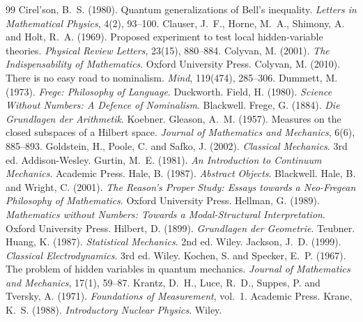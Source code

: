 \documentclass{situationist-preprint}
\begin{document}
\begin{thebibliography}{99}
 Cirel'son, B.~S. (1980). Quantum generalizations of Bell's inequality. \emph{Letters in Mathematical Physics}, 4(2), 93--100.
 Clauser, J.~F., Horne, M.~A., Shimony, A. and Holt, R.~A. (1969). Proposed experiment to test local hidden-variable theories. \emph{Physical Review Letters}, 23(15), 880--884.
 Colyvan, M. (2001). \emph{The Indispensability of Mathematics}. Oxford University Press.
 Colyvan, M. (2010). There is no easy road to nominalism. \emph{Mind}, 119(474), 285--306.
 Dummett, M. (1973). \emph{Frege: Philosophy of Language}. Duckworth.
 Field, H. (1980). \emph{Science Without Numbers: A Defence of Nominalism}. Blackwell.
 Frege, G. (1884). \emph{Die Grundlagen der Arithmetik}. Koebner.
 Gleason, A.~M. (1957). Measures on the closed subspaces of a Hilbert space. \emph{Journal of Mathematics and Mechanics}, 6(6), 885--893.
 Goldstein, H., Poole, C. and Safko, J. (2002). \emph{Classical Mechanics}. 3rd ed. Addison-Wesley.
 Gurtin, M.~E. (1981). \emph{An Introduction to Continuum Mechanics}. Academic Press.
 Hale, B. (1987). \emph{Abstract Objects}. Blackwell.
 Hale, B. and Wright, C. (2001). \emph{The Reason's Proper Study: Essays towards a Neo-Fregean Philosophy of Mathematics}. Oxford University Press.
 Hellman, G. (1989). \emph{Mathematics without Numbers: Towards a Modal-Structural Interpretation}. Oxford University Press.
 Hilbert, D. (1899). \emph{Grundlagen der Geometrie}. Teubner.
 Huang, K. (1987). \emph{Statistical Mechanics}. 2nd ed. Wiley.
 Jackson, J.~D. (1999). \emph{Classical Electrodynamics}. 3rd ed. Wiley.
 Kochen, S. and Specker, E.~P. (1967). The problem of hidden variables in quantum mechanics. \emph{Journal of Mathematics and Mechanics}, 17(1), 59--87.
 Krantz, D.~H., Luce, R.~D., Suppes, P. and Tversky, A. (1971). \emph{Foundations of Measurement}, vol.~1. Academic Press.
 Krane, K.~S. (1988). \emph{Introductory Nuclear Physics}. Wiley.

\end{thebibliography}
\end{document}
